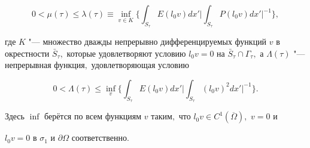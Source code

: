 \begin{theorem}[3]
\begin{equation}
0<\mu(\tau)\leq \lambda(\tau)\equiv\mathop{\inf }\limits_{v\in K} 

\biggl\{\int _{S_\tau}E(l_0v)dx'\biggl|{\int _{S_\tau}P(l_0v)dx'\biggr|^{-1}}\biggr\},

\end{equation}

где $K$ "--- множество дважды непрерывно дифференцируемых функций $v$ в окрестности $\bar{S}_\tau,$ которые удовлетворяют условию $l_0v=0$ на $\bar{S}_\tau \cap\Gamma_\tau,$ а $\Lambda(\tau)$ "--- непрерывная функция$,$ удовлетворяющая условию

\begin{equation}

\label{eq:kha:e21}

0<\Lambda(\tau)\leq \mathop{\inf }\limits_{v} \biggl\{\int _{S_\tau}E(l_0v)dx'\biggl|{\int _{S_\tau}(l_0v)^2dx'\biggr|^{-1}}\biggr\}.

\end{equation}

Здесь $\mathop{\inf }$ берётся по всем функциям $v$ таким$,$ что $l_0v\in C^1(\overline{\Omega}),$ $v=0$  и

$l_0v=0$  в $\sigma_1$ и $\partial\Omega$ соответственно\rm.

\end{theorem}



\smallskip



